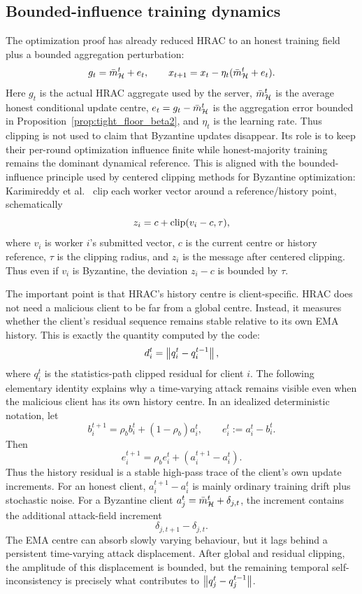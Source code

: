 \subsection{Bounded-influence training dynamics}
\label{subsec:bounded_influence_dynamics}

The optimization proof has already reduced HRAC to an honest training field
plus a bounded aggregation perturbation:
\begin{equation}
    g_t
    =
    \bar m_{\mathcal{H}}^t+e_t,
    \qquad
    x_{t+1}
    =
    x_t-\eta_t(\bar m_{\mathcal{H}}^t+e_t).
    \label{eq:hrac_training_dynamics}
\end{equation}
Here \(g_t\) is the actual HRAC aggregate used by the server,
\(\bar m_{\mathcal{H}}^t\) is the average honest conditional update centre,
\(e_t=g_t-\bar m_{\mathcal{H}}^t\) is the aggregation error bounded in
Proposition~\ref{prop:tight_floor_beta2}, and \(\eta_t\) is the learning rate.
Thus clipping is not used to claim that Byzantine updates disappear. Its role
is to keep their per-round optimization influence finite while honest-majority
training remains the dominant dynamical reference. This is aligned with the
bounded-influence principle used by centered clipping methods for Byzantine
optimization: Karimireddy et al.~\cite[Algorithm~1]{pmlr-v139-karimireddy21a}
clip each worker vector around a reference/history point, schematically
\[
    z_i
    =
    c+\operatorname{clip}(v_i-c,\tau),
\]
where \(v_i\) is worker \(i\)'s submitted vector, \(c\) is the current centre
or history reference, \(\tau\) is the clipping radius, and \(z_i\) is the
message after centered clipping. Thus even if \(v_i\) is Byzantine, the
deviation \(z_i-c\) is bounded by \(\tau\).

The important point is that HRAC's history centre is client-specific. HRAC does
not need a malicious client to be far from a global centre. Instead, it measures
whether the client's residual sequence remains stable relative to its own EMA
history. This is exactly the quantity computed by the code:
\[
    d_i^t
    =
    \left\lVert q_i^t-q_i^{t-1} \right\rVert,
\]
where \(q_i^t\) is the statistics-path clipped residual for client \(i\).
The following elementary identity explains why a time-varying attack remains
visible even when the malicious client has its own history centre. In an
idealized deterministic notation, let
\[
    b_i^{t+1}
    =
    \rho_b b_i^t+(1-\rho_b)a_i^t,
    \qquad
    e_i^t:=a_i^t-b_i^t.
\]
Then
\begin{equation}
    e_i^{t+1}
    =
    \rho_b e_i^t+(a_i^{t+1}-a_i^t).
    \label{eq:client_history_high_pass}
\end{equation}
Thus the history residual is a stable high-pass trace of the client's own
update increments. For an honest client, \(a_i^{t+1}-a_i^t\) is mainly ordinary
training drift plus stochastic noise. For a Byzantine client
\(a_j^t=\bar m_{\mathcal{H}}^t+\delta_{j,t}\), the increment contains the additional
attack-field increment
\[
    \delta_{j,t+1}-\delta_{j,t}.
\]
The EMA centre can absorb slowly varying behaviour, but it lags behind a
persistent time-varying attack displacement. After global and residual clipping,
the amplitude of this displacement is bounded, but the remaining temporal
self-inconsistency is precisely what contributes to
\(\left\lVert q_j^t-q_j^{t-1} \right\rVert\).

